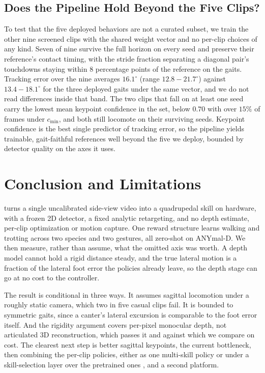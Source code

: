 \documentclass[letterpaper, 10 pt, conference]{ieeeconf}
\newif\ifappendix
\begin{document}
\subsection{Does the Pipeline Hold Beyond the Five Clips?}\label{subsec:exp-breadth}
\noindent
To test that the five deployed behaviors are not a curated subset, we train the other nine screened clips with the shared weight vector and no per-clip choices of any kind. Seven of nine survive the full horizon on every seed and preserve their reference's contact timing, with the stride fraction separating a diagonal pair's touchdowns staying within $8$ percentage points of the reference on the gaits. Tracking error over the nine averages $16.1^\circ$ (range $12.8-21.7^\circ$) against $13.4-18.1^\circ$ for the three deployed gaits under the same vector, and we do not read differences inside that band. The two clips that fall on at least one seed carry the lowest mean keypoint confidence in the set, below $0.70$ with over $15\%$ of frames under $c_{\min}$, and both still locomote on their surviving seeds. Keypoint confidence is the best single predictor of tracking error, so the pipeline yields trainable, gait-faithful references well beyond the five we deploy, bounded by detector quality on the axes it uses.



\section{Conclusion and Limitations}\label{sec:limitations}
\noindent
\ourMethod turns a single uncalibrated side-view video into a quadrupedal skill on hardware, with a frozen 2D detector, a fixed analytic retargeting, and no depth estimate, per-clip optimization or motion capture. One reward structure learns walking and trotting across two species and two gestures, all zero-shot on ANYmal-D. We then measure, rather than assume, what the omitted axis was worth. A depth model cannot hold a rigid distance steady, and the true lateral motion is a fraction of the lateral foot error the policies already leave, so the depth stage can go at no cost to the controller.


The result is conditional in three ways. It assumes sagittal locomotion under a roughly static camera, which two in five casual clips fail. It is bounded to symmetric gaits, since a canter's lateral excursion is comparable to the foot error itself. And the rigidity argument covers per-pixel monocular depth, not articulated 3D reconstruction, which passes it and against which we compare on cost. The clearest next step is better sagittal keypoints, the current bottleneck, then combining the per-clip policies, either as one multi-skill policy or under a skill-selection layer over the pretrained ones \cite{wu2025vocaloco}, and a second platform.






\ifappendix
\clearpage

\fi
\end{document}

